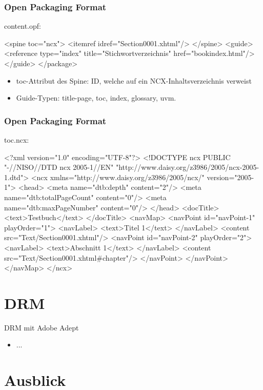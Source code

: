 \documentclass[hyperref={pdfpagelabels=false}]{beamer}
\begin{document}
\begin{frame}[fragile]
\frametitle{Open Packaging Format}
content.opf:
\begin{xml}
  <spine toc="ncx">
    <itemref idref="Section0001.xhtml"/>
  </spine>
	<guide>
		<reference type="index" title="Stichwortverzeichnis" href="bookindex.html"/>
	</guide>
</package>
\end{xml}
	\begin{itemize}
		\item toc-Attribut des Spine: ID, welche auf ein NCX-Inhaltsverzeichnis verweist
		\item Guide-Typen: title-page, toc, index, glossary, uvm.
	\end{itemize}
\end{frame}

\begin{frame}[fragile]
\frametitle{Open Packaging Format}
toc.ncx:
\begin{xml}
<?xml version="1.0" encoding="UTF-8"?>
<!DOCTYPE ncx PUBLIC "-//NISO//DTD ncx 2005-1//EN" "http://www.daisy.org/z3986/2005/ncx-2005-1.dtd">
<ncx xmlns="http://www.daisy.org/z3986/2005/ncx/" version="2005-1">
  <head>
    <meta name="dtb:depth" content="2"/>
    <meta name="dtb:totalPageCount" content="0"/>
    <meta name="dtb:maxPageNumber" content="0"/>
  </head>
  <docTitle>
    <text>Testbuch</text>
  </docTitle>
  <navMap>
    <navPoint id="navPoint-1" playOrder="1">
      <navLabel>
        <text>Titel 1</text>
      </navLabel>
      <content src="Text/Section0001.xhtml"/>
      <navPoint id="navPoint-2" playOrder="2">
        <navLabel>
          <text>Abschnitt 1</text>
        </navLabel>
        <content src="Text/Section0001.xhtml#chapter"/>
      </navPoint>
    </navPoint>
  </navMap>
</ncx>
\end{xml}
\end{frame}



\section{DRM}

\begin{frame}{DRM mit Adobe Adept}
	\begin{itemize}
		\item ...
	\end{itemize}
\end{frame}


\section{Ausblick}
\end{document}
